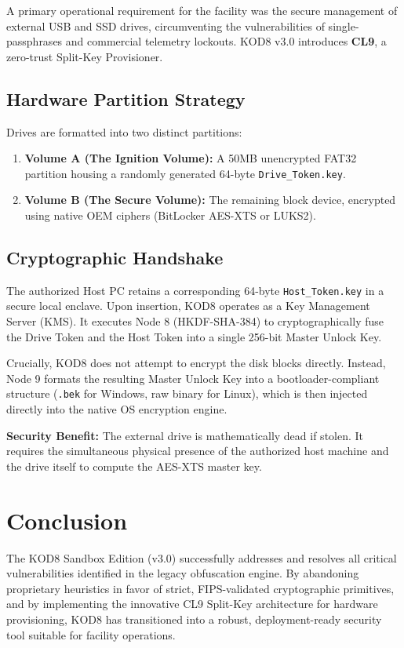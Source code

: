 \documentclass[11pt]{article}
\begin{document}
A primary operational requirement for the facility was the secure management of external USB and SSD drives, circumventing the vulnerabilities of single-passphrases and commercial telemetry lockouts. KOD8 v3.0 introduces \textbf{CL9}, a zero-trust Split-Key Provisioner.

\subsection{Hardware Partition Strategy}
Drives are formatted into two distinct partitions:
\begin{enumerate}
    \item \textbf{Volume A (The Ignition Volume):} A 50MB unencrypted FAT32 partition housing a randomly generated 64-byte \texttt{Drive\_Token.key}.
    \item \textbf{Volume B (The Secure Volume):} The remaining block device, encrypted using native OEM ciphers (BitLocker AES-XTS or LUKS2).
\end{enumerate}

\subsection{Cryptographic Handshake}
The authorized Host PC retains a corresponding 64-byte \texttt{Host\_Token.key} in a secure local enclave. Upon insertion, KOD8 operates as a Key Management Server (KMS). It executes Node 8 (HKDF-SHA-384) to cryptographically fuse the Drive Token and the Host Token into a single 256-bit Master Unlock Key. 

Crucially, KOD8 does not attempt to encrypt the disk blocks directly. Instead, Node 9 formats the resulting Master Unlock Key into a bootloader-compliant structure (\texttt{.bek} for Windows, raw binary for Linux), which is then injected directly into the native OS encryption engine. 

\textbf{Security Benefit:} The external drive is mathematically dead if stolen. It requires the simultaneous physical presence of the authorized host machine and the drive itself to compute the AES-XTS master key.

\section{Conclusion}

The KOD8 Sandbox Edition (v3.0) successfully addresses and resolves all critical vulnerabilities identified in the legacy obfuscation engine. By abandoning proprietary heuristics in favor of strict, FIPS-validated cryptographic primitives, and by implementing the innovative CL9 Split-Key architecture for hardware provisioning, KOD8 has transitioned into a robust, deployment-ready security tool suitable for facility operations.
\end{document}
